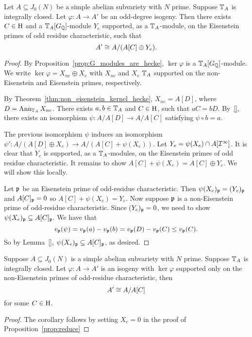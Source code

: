 \documentclass[thesis.tex]{subfiles}
\begin{document}
\begin{proposition}
    \label{prop:reduce}
    Let $A\subseteq J_0(N)$ be a simple abelian subvariety with $N$ prime.
    Suppose $\mathbb{T}_A$ is integrally closed. Let $\varphi:A\to A'$ be an
    odd-degree isogeny. Then there exists $C\in \operatorname{H}$ and a $\mathbb{T}_A[G_{\mathbb{Q}}]$-module
    $Y_e$ supported, as a $\mathbb{T}_A$-module, on the Eisenstein primes of odd
    residue characteristic, such that
    \[
        A'\cong A/(A[C]\oplus Y_e).
    \]
\end{proposition}
\begin{proof}
    By Proposition~\ref{prop:G_modules_are_hecke}, $\ker\varphi$ is a
    $\mathbb{T}_A[G_{\mathbb{Q}}]$-module. We write $\ker\varphi = X_{ne} \oplus X_e$ with
    $X_{ne}$ and $X_e$ $\mathbb{T}_A$ supported on the non-Eisenstein and Eisenstein
    primes, respectively.

    By Theorem~\ref{thm:non_eisenstein_kernel_hecke}, $X_{ne} = A[D]$, where
    $D=\operatorname{Ann}_{\mathbb{T}_A} X_{ne}$. There exists $a,b\in \mathbb{T}_A$ and $C\in \operatorname{H}$, such
    that $aC=bD$. By~\ref{}, there exists an isomorphism $\psi:A/A[D]\to
    A/A[C]$ satisfying $\psi \circ b = a$.

    The previous isomorphism $\psi$ induces an isomorphism $\psi':A/(A[D]\oplus
    X_e)\to A/(A[C] + \psi(X_e))$. Let $Y_e = \psi(X_e)\cap A[\mathcal{I}^\infty]$. It
    is clear that $Y_e$ is supported, as a $\mathbb{T}_A$-modules, on the Eisenstein
    primes of odd residue characteristic. It remains to show $A[C] + \psi(X_e)
    = A[C]\oplus Y_e$. We will show this locally.

    Let $\mathfrak{p}$ be an Eisenstein prime of odd-residue characteristic. Then
    $\psi(X_e)_{\mathfrak{p}} = (Y_e)_{\mathfrak{p}}$ and $A[C]_{\mathfrak{p}}=0$ so $A[C]+\psi(X_e)=Y_e$. Now
    suppose $\mathfrak{p}$ is a non-Eisenstein prime of odd-residue characteristic. Since
    $(Y_e)_{\mathfrak{p}} = 0$, we need to show $\psi(X_e)_{\mathfrak{p}} \subseteq A[C]_{\mathfrak{p}}$. We have
    that
    \[
        v_{\mathfrak{p}}(\psi) =  v_{\mathfrak{p}}(a)-v_{\mathfrak{p}}(b) = v_{\mathfrak{p}}(D) - v_{\mathfrak{p}}(C) \leq v_{\mathfrak{p}}(C).
    \] 
    So by Lemma~\ref{}, $\psi(X_e)_{\mathfrak{p}} \subseteq A[C]_{\mathfrak{p}}$, as desired.
\end{proof}

\begin{corollary}
    Suppose $A\subseteq J_0(N)$ is a simple abelian subvariety with $N$ prime.
    Suppose $\mathbb{T}_A$ is integrally closed. Let $\varphi:A\to A'$ is an isogeny
    with $\ker\varphi$ supported only on the non-Eisenstein primes of
    odd-residue characteristic, then
    \[
        A' \cong A/A[C]
    \]
    for some $C\in \operatorname{H}$.
\end{corollary}
\begin{proof}
    The corollary follows by setting $X_e=0$ in the proof of
    Proposition~\ref{prop:reduce}
\end{proof}
\end{document}
